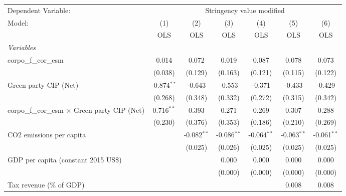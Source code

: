 
\begingroup
\centering
\begin{tabular}{lcccccc}
   \toprule
   Dependent Variable: & \multicolumn{6}{c}{Stringency value modified}\\
   Model:                                                & (1)           & (2)           & (3)           & (4)           & (5)           & (6)\\  
                                                         &  OLS          & OLS           & OLS           & OLS           & OLS           & OLS\\  
   \midrule
   \emph{Variables}\\
   corpo\_f\_cor\_esm                                    & 0.014         & 0.072         & 0.019         & 0.087         & 0.078         & 0.073\\   
                                                         & (0.038)       & (0.129)       & (0.163)       & (0.121)       & (0.115)       & (0.122)\\   
   Green party CIP (Net)                                 & -0.874$^{**}$ & -0.643        & -0.553        & -0.371        & -0.433        & -0.429\\   
                                                         & (0.268)       & (0.348)       & (0.332)       & (0.272)       & (0.315)       & (0.342)\\   
   corpo\_f\_cor\_esm $\times$ Green party CIP (Net)     & 0.716$^{**}$  & 0.393         & 0.271         & 0.269         & 0.307         & 0.288\\   
                                                         & (0.230)       & (0.376)       & (0.353)       & (0.186)       & (0.210)       & (0.269)\\   
   CO2 emissions per capita                              &               & -0.082$^{**}$ & -0.086$^{**}$ & -0.064$^{**}$ & -0.063$^{**}$ & -0.061$^{**}$\\   
                                                         &               & (0.025)       & (0.026)       & (0.025)       & (0.025)       & (0.025)\\   
   GDP per capita (constant 2015 US\$)                   &               &               & 0.000         & 0.000         & 0.000         & 0.000\\   
                                                         &               &               & (0.000)       & (0.000)       & (0.000)       & (0.000)\\   
   Tax revenue (\% of GDP)                               &               &               &               &               & 0.008         & 0.008\\   

\end{tabular}
